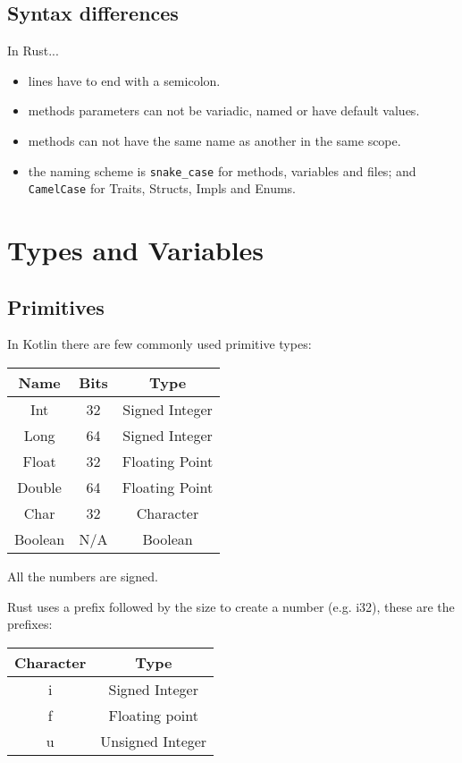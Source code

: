 \documentclass[a4paper,11pt]{article}
\begin{document}
\subsection{Syntax differences}
In Rust...
\begin{itemize}
	\item lines have to end with a semicolon.
  \item methods parameters can not be variadic, named or have default values.
  \item methods can not have the same name as another in the same scope.
  \item the naming scheme is \lstinline{snake_case} for methods, variables and files; and \lstinline{CamelCase} for Traits, Structs, Impls and Enums.
\end{itemize}

\newpage
\section{Types and Variables}
\subsection{Primitives}
In Kotlin there are few commonly used primitive types:

\renewcommand{\arraystretch}{1.3}

\begin{center}
\begin{tabular}{ c|c|c } 
 
 Name & Bits & Type \\ 
 \hline
 Int & 32 & Signed Integer \\ 
 Long & 64 & Signed Integer \\ 
 Float & 32 & Floating Point \\ 
 Double & 64 & Floating Point \\ 
 Char & 32 & Character \\ 
 Boolean & N/A & Boolean \\ 
 
\end{tabular}
\end{center}
All the numbers are signed. 

Rust uses a prefix followed by the size to create a number (e.g. i32), these are the prefixes:

\begin{center}
\begin{tabular}{ c|c } 

 Character & Type \\ 
 \hline
 i & Signed Integer \\ 
 f & Floating point \\ 
 u & Unsigned Integer \\ 
 
\end{tabular}
\end{center}
\end{document}
